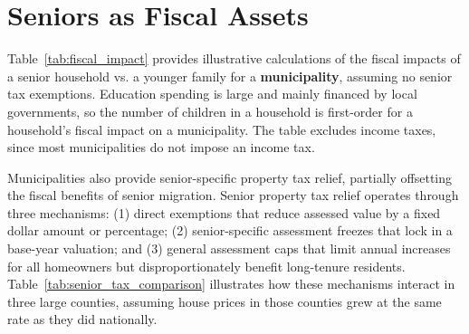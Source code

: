 \documentclass[11pt]{article}
\begin{document}
    
\section{Seniors as Fiscal Assets}
Table~\ref{tab:fiscal_impact} provides illustrative calculations of the fiscal impacts of a senior household vs. a younger family for a \textbf{municipality}, assuming no senior tax exemptions. Education spending is large and mainly financed by local governments, so the number of children in a household is first-order for a household's fiscal impact on a municipality. The table excludes income taxes, since most municipalities do not impose an income tax.




Municipalities also provide senior-specific property tax relief, partially offsetting the fiscal benefits of senior migration. Senior property tax relief operates through three mechanisms: (1) direct exemptions that reduce assessed value by a fixed dollar amount or percentage; (2) senior-specific assessment freezes that lock in a base-year valuation; and (3) general assessment caps that limit annual increases for all homeowners but disproportionately benefit long-tenure residents. Table~\ref{tab:senior_tax_comparison} illustrates how these mechanisms interact in three large counties, assuming house prices in those counties grew at the same rate as they did nationally.
\end{document}
